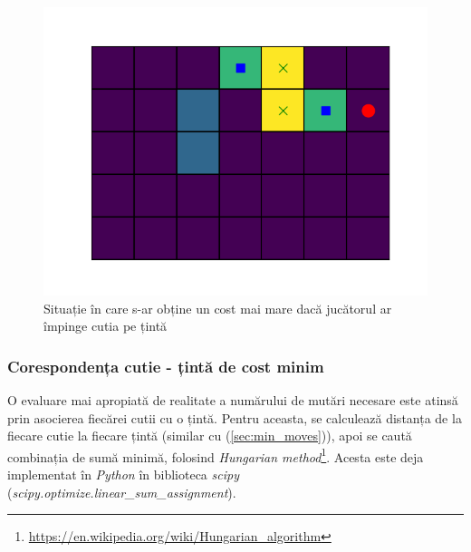 \documentclass{article}
\begin{document}
\begin{figure}[ht]
    \begin{center}
        \includegraphics[scale=0.4]{scared.png}
    \end{center}
    \caption{Situație în care s-ar obține un cost mai mare dacă jucătorul ar 
    împinge cutia pe țintă}
    \label{fig:scared}
\end{figure}

\subsubsection{Corespondența cutie - țintă de cost minim}
O evaluare mai apropiată de realitate a numărului de mutări necesare este atinsă
prin asocierea fiecărei cutii cu o țintă. Pentru aceasta, se calculează distanța
de la fiecare cutie la fiecare țintă (similar cu (\ref{sec:min_moves})), apoi se
caută combinația de sumă minimă, folosind 
\textit{Hungarian method}\footnote{\url{https://en.wikipedia.org/wiki/Hungarian_algorithm}}. 
Acesta este deja implementat în \textit{Python} în biblioteca \textit{scipy} 
(\textit{scipy.optimize.linear\_sum\_assignment}).
\end{document}
